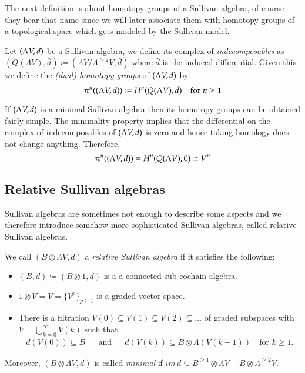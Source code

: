 The next definition is about homotopy groups of a Sullivan algebra, of course they bear that name since we will later
associate them with homotopy groups of a topological space which gets modeled by the Sullivan model.

\begin{Definition}
 Let $(\Lambda V,d)$ be a Sullivan algebra, we define its complex of \emph{indecomposables} as
 $(Q(\Lambda V),\bar{d}) \coloneqq (\Lambda V / \Lambda^{\geq 2} V , \bar{d})$ where $\bar{d}$ is the induced differential.
 Given this we define the \emph{(dual) homotopy groups} of $(\Lambda V,d)$ by 
 $$ \pi^n ( (\Lambda V,d)) \coloneqq H^n(Q(\Lambda V),\bar{d}) \quad \text{for $n \geq 1$}$$
\end{Definition}

\begin{Remark}
 If $(\Lambda V,d)$ is a minimal Sullivan algebra then its homotopy groups can be obtained fairly simple. The minimality property
 implies that the differential on the complex of indecomposables of $(\Lambda V,d)$ is zero and hence taking
 homology does not change anything. Therefore, 
 $$ \pi^n ( (\Lambda V,d)) = H^n(Q(\Lambda V),0) \cong V^n$$
\end{Remark}

\subsection{Relative Sullivan algebras}

Sullivan algebras are sometimes not enough to describe some aspects and we therefore introduce somehow more sophisticated
Sullivan algebras, called relative Sullivan algebras.

\begin{Definition}
 We call $(B \otimes \Lambda V,d)$ a \emph{relative Sullivan algebra} if it satisfies the following:
 
 \begin{itemize}
  \item $(B,d) \coloneqq (B \otimes 1, d)$ is a a connected sub cochain algebra.
  \item $1 \otimes V = V = { \lbrace V^p \rbrace}_{ p \geq 1}$ is a graded vector space.
  \item There is a filtration $V(0) \subseteq V(1) \subseteq V(2) \subseteq \ldots$ of graded subspaces
    with  $ V = \bigcup_{k = 0}^{\infty} V(k)$ such that 
    \begin{align*}
     d(V(0)) \subseteq B &  & \text{and} & & d(V(k)) \subseteq B \otimes \Lambda (V(k-1)) \quad \text{for $k \geq 1$.}
    \end{align*}
 \end{itemize}
 Moreover, $(B \otimes \Lambda V,d)$ is called \emph{minimal} if 
 $im \, d \subseteq B^{\geq 1} \otimes \Lambda V + B \otimes \Lambda^{\geq 2} V$.
\end{Definition}

